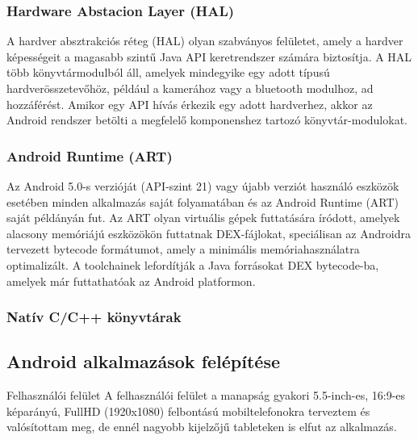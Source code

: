 \documentclass[../main.tex]{subfiles}
\begin{document}
        \subsubsection{Hardware Abstacion Layer (HAL)}
            A hardver absztrakciós réteg (HAL) olyan szabványos felületet, amely a hardver képességeit a magasabb szintű Java API keretrendszer számára biztosítja. A HAL több könyvtármodulból áll, amelyek mindegyike egy adott típusú hardverösszetevőhöz, például a kamerához vagy a bluetooth modulhoz, ad hozzáférést. Amikor egy API hívás érkezik egy adott hardverhez, akkor az Android rendszer betölti a megfelelő komponenshez tartozó könyvtár-modulokat.
            
        \subsubsection{Android Runtime (ART)}
            Az Android 5.0-s verzióját (API-szint 21) vagy újabb verziót használó eszközök esetében minden alkalmazás saját folyamatában és az Android Runtime (ART) saját példányán fut. Az ART olyan virtuális gépek futtatására íródott, amelyek alacsony memóriájú eszközökön futtatnak DEX-fájlokat, speciálisan az Androidra tervezett bytecode formátumot, amely a minimális memóriahasználatra optimalizált. A toolchainek lefordítják a Java forrásokat DEX bytecode-ba, amelyek már futtathatóak az Android platformon.
            
        \subsubsection{Natív C/C++ könyvtárak}
            
        
    \subsection{Android alkalmazások felépítése}
    
        
    
        
        Felhasználói felület
        A felhasználói felület a manapság gyakori 5.5-inch-es, 16:9-es képarányú, FullHD (1920x1080) felbontású mobiltelefonokra terveztem és valósítottam meg, de ennél nagyobb kijelzőjű tableteken is elfut az alkalmazás.
        
        
\end{document}
